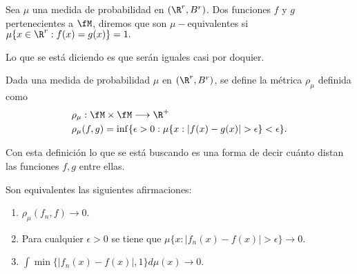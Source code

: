 \begin{definicion}
    Sea $\mu$ una medida de probabilidad en $(\R^r, B^r)$.  Dos funciones 
    $f$ y $g$ pertenecientes a $\fM$, diremos que son $\mu -$equivalentes 
    si $\mu\{ x \in \R^r : f(x)=g(x) \} = 1.$
\end{definicion}

Lo que se está diciendo es que serán iguales casi por doquier.   

\begin{definicion} 
    Dada una medida de probabilidad $\mu$ en $(\R^r, B^r)$, se define 
    la métrica $\rho_{\mu}$ definida como 
    \begin{equation}
        \begin{split}
            & \rho_{\mu} : \fM \times \fM \longrightarrow \R^+ \\
            & \rho_{\mu}(f,g) = \inf \{ \epsilon > 0: \mu \{ x : |f(x) - g(x)| > \epsilon \} < \epsilon \}.
        \end{split}
    \end{equation}
\end{definicion}  

Con esta definición lo que se está buscando es una forma de decir cuánto 
distan las funciones $f,g$ entre ellas.  

\begin{lema}\label{lema:caracterizacionConvergenciaSucesiones2_1}
    Son equivalentes las siguientes afirmaciones: 
    \begin{enumerate}
        \item $\rho_{\mu}(f_n, f) \longrightarrow 0$.
        \item Para cualquier  $\epsilon > 0$ se tiene que $\mu \{  x : |f_n(x) - f(x)| > \epsilon \} \longrightarrow 0$.
        \item $\int \min \{ |f_n(x) - f(x)|, 1\} d\mu(x) \longrightarrow 0.$
    \end{enumerate}
\end{lema}

